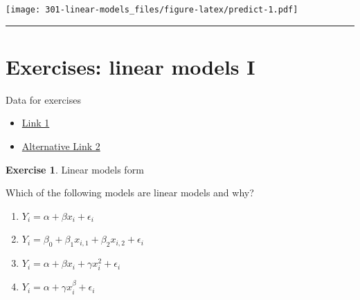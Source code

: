\documentclass[
]{book}
\newenvironment{Shaded}{\begin{snugshade}}{\end{snugshade}}
\newcommand{\CommentTok}[1]{\textcolor[rgb]{0.56,0.35,0.01}{\textit{#1}}}
\newcommand{\DataTypeTok}[1]{\textcolor[rgb]{0.13,0.29,0.53}{#1}}
\newcommand{\DecValTok}[1]{\textcolor[rgb]{0.00,0.00,0.81}{#1}}
\newcommand{\KeywordTok}[1]{\textcolor[rgb]{0.13,0.29,0.53}{\textbf{#1}}}
\newcommand{\NormalTok}[1]{#1}
\newcommand{\OperatorTok}[1]{\textcolor[rgb]{0.81,0.36,0.00}{\textbf{#1}}}
\newcommand{\StringTok}[1]{\textcolor[rgb]{0.31,0.60,0.02}{#1}}
\providecommand{\tightlist}{%
  \setlength{\itemsep}{0pt}\setlength{\parskip}{0pt}}
\theoremstyle{definition}
\theoremstyle{definition}
\theoremstyle{definition}
\newtheorem{exercise}{Exercise}[chapter]
\theoremstyle{remark}
\begin{document}
\begin{Shaded}
\end{Shaded}

\texttt{[image: 301-linear-models\_files/figure-latex/predict-1.pdf]}

\begin{center}\rule{0.5\linewidth}{0.5pt}\end{center}

\hypertarget{exercises-linear-models-i}{%
\section{Exercises: linear models I}\label{exercises-linear-models-i}}

Data for exercises

\begin{itemize}
\tightlist
\item
  \href{https://github.com/olgadet/bookdown-mlbiostatistics/tree/master/data/data.zip}{Link 1}
\item
  \href{https://stockholmuniversity.box.com/s/z5kwg0nlwe5la4h5t8bshpj57pylif14}{Alternative Link 2}
\end{itemize}

\begin{exercise}
\protect\hypertarget{exr:lm-recognize}{}{\label{exr:lm-recognize} }Linear models form

Which of the following models are linear models and why?

\begin{enumerate}
\def\labelenumi{\alph{enumi})}
\tightlist
\item
  \(Y_i=\alpha + \beta x_i + \epsilon_i\)
\item
  \(Y_i=\beta_0 + \beta_1 x_{i,1} + \beta_2 x_{i,2} + \epsilon_i\)
\item
  \(Y_i=\alpha + \beta x_i + \gamma x_i^2 + \epsilon_i\)
\item
  \(Y_i=\alpha + \gamma x_i^\beta + \epsilon_i\)
\end{enumerate}
\end{exercise}
\end{document}
